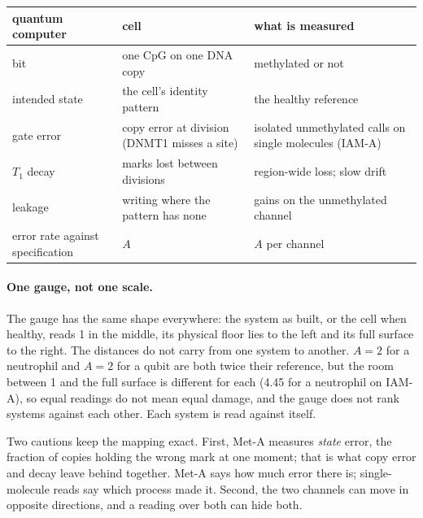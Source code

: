 \begin{center}\small
\begin{tabular}{@{}p{}p{}p{}@{}}\toprule
quantum computer & cell & what is measured \\\midrule
bit & one CpG on one DNA copy & methylated or not \\
intended state & the cell's identity pattern & the healthy reference \\
gate error & copy error at division (DNMT1 misses a site) & isolated unmethylated calls on single molecules (IAM-A) \\
$T_1$ decay & marks lost between divisions & region-wide loss; slow drift \\
leakage & writing where the pattern has none & gains on the unmethylated channel \\
error rate against specification & $A$ & $A$ per channel \\\bottomrule
\end{tabular}
\end{center}

\paragraph{One gauge, not one scale.} The gauge has the same shape everywhere: the system as built, or the cell when healthy, reads 1 in the
middle, its physical floor lies to the left and its full surface to the right. The distances do not carry from one system to another. $A=2$
for a neutrophil and $A=2$ for a qubit are both twice their reference, but the room between 1 and the full surface is different for each
(4.45 for a neutrophil on IAM-A), so equal readings do not mean equal damage, and the gauge does not rank systems against each other. Each
system is read against itself. \derived

Two cautions keep the mapping exact. First, Met-A measures \emph{state} error, the fraction of copies holding the wrong mark at one moment;
that is what copy error and decay leave behind together. Met-A says how much error there is; single-molecule reads say which process made
it. Second, the two channels can move in opposite directions, and a reading over both can hide both.

